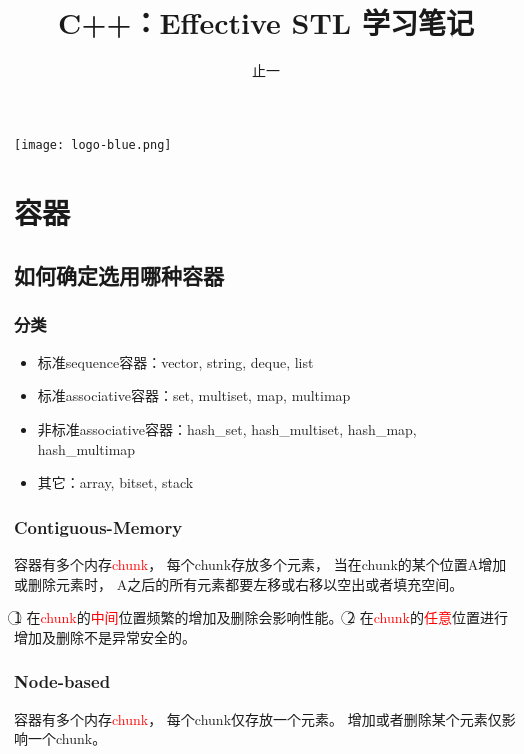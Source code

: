 \documentclass[cn,geye,blue,14pt,normal]{elegantnote}
\title{C++：Effective STL 学习笔记}
\author{止一}
\institute{坐忘$\leftrightarrow$虚静}
\date{\zhtoday}
\begin{document}
\maketitle

\centerline{
  \texttt{[image: logo-blue.png]}
}

\tableofcontents
\newpage



\section{容器}
\subsection{如何确定选用哪种容器}
\subsubsection{分类}
\begin{itemize}
  \item \textcolor{eblue}{标准sequence容器}：vector, string, deque, list
  \item \textcolor{eblue}{标准associative容器}：set, multiset, map, multimap
  \item \textcolor{eblue}{非标准associative容器}：hash\_set, hash\_multiset,
        hash\_map, hash\_multimap
  \item \textcolor{eblue}{其它}：array, bitset, stack
\end{itemize}

\subsubsection{Contiguous-Memory}
容器有多个内存\textcolor{red}{chunk}，
每个chunk存放多个元素，
当在chunk的某个位置A增加或删除元素时，
A之后的所有元素都要左移或右移以空出或者填充空间。

\begin{note}
  \textcircled{1} 在\textcolor{red}{chunk}的\textcolor{red}{中间}位置频繁的增加及删除会影响性能。
  \textcircled{2} 在\textcolor{red}{chunk}的\textcolor{red}{任意}位置进行增加及删除不是异常安全的。
\end{note}


\subsubsection{Node-based}
容器有多个内存\textcolor{red}{chunk}，
每个chunk仅存放一个元素。
增加或者删除某个元素仅影响一个chunk。
\end{document}
